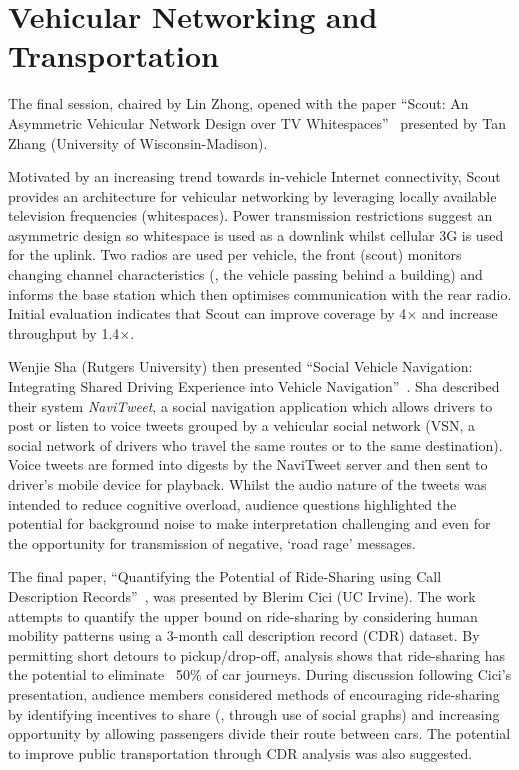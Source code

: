 \section{Vehicular Networking and Transportation}
\label{sec:vehiclenets}
The final session, chaired by Lin Zhong, opened with the paper ``Scout: An 
Asymmetric Vehicular Network Design over TV Whitespaces''~\cite{zhang13}
presented by Tan Zhang 
(University of Wisconsin-Madison).

Motivated by an increasing trend towards in-vehicle Internet connectivity, Scout 
provides an architecture for vehicular networking by leveraging locally available 
television frequencies (whitespaces). Power transmission restrictions suggest an 
asymmetric design so whitespace is used as a downlink whilst cellular 3G is 
used for the uplink. Two radios are used per vehicle, the front (scout) 
monitors changing channel characteristics (\eg{}, the vehicle passing behind a 
building) and informs the base station which then optimises communication with 
the rear radio. Initial evaluation indicates that Scout can improve coverage by 
4$\times$ and increase throughput by 1.4$\times$.

Wenjie Sha (Rutgers University) then presented ``Social Vehicle Navigation: 
Integrating Shared Driving Experience into Vehicle
Navigation''~\cite{sha13}. Sha described 
their system \emph{NaviTweet}, a social navigation application which allows drivers 
to post or listen to voice tweets grouped by a vehicular social 
network (VSN, a social network of drivers who travel the same routes or to the 
same destination). Voice tweets are formed into digests by the 
NaviTweet server and then sent to driver's mobile device for playback.
Whilst the audio nature of the tweets 
was intended to reduce cognitive overload, audience questions highlighted the 
potential for background noise to make interpretation challenging and even for 
the opportunity for transmission of negative, `road rage' messages.

The final paper, ``Quantifying the Potential of Ride-Sharing using Call 
Description Records''~\cite{cici13}, was presented by Blerim Cici
(UC Irvine). 
The work attempts to quantify the upper bound on ride-sharing 
by considering human mobility patterns using a 
3-month call description record (CDR) dataset.
By permitting short detours to pickup\slash drop-off,
analysis shows that ride-sharing has the potential to eliminate ~50\% of car 
journeys. During discussion following Cici's presentation, audience members
considered methods of encouraging ride-sharing by identifying incentives to
share (\eg{}, through use of social graphs) and increasing opportunity by 
allowing passengers divide their route between cars. The potential to
improve public transportation through CDR analysis was also suggested.
